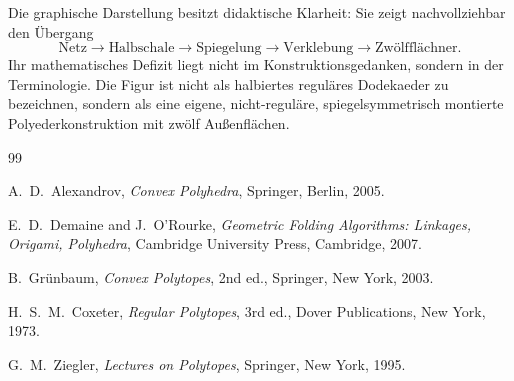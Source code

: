 \documentclass[11pt]{article}
\theoremstyle{plain}
\theoremstyle{definition}
\theoremstyle{remark}
\begin{document}
	Die graphische Darstellung besitzt didaktische Klarheit: Sie zeigt nachvollziehbar den Übergang
	\[
	\text{Netz} \longrightarrow \text{Halbschale} \longrightarrow \text{Spiegelung} \longrightarrow \text{Verklebung} \longrightarrow \text{Zwölfflächner}.
	\]
	Ihr mathematisches Defizit liegt nicht im Konstruktionsgedanken, sondern in der Terminologie. Die Figur ist nicht als halbiertes reguläres Dodekaeder zu bezeichnen, sondern als eine eigene, nicht-reguläre, spiegelsymmetrisch montierte Polyederkonstruktion mit zwölf Außenflächen.
	
	\begin{thebibliography}{99}
		
		A.~D.~Alexandrov,
		\emph{Convex Polyhedra},
		Springer, Berlin, 2005.
		
		E.~D.~Demaine and J.~O'Rourke,
		\emph{Geometric Folding Algorithms: Linkages, Origami, Polyhedra},
		Cambridge University Press, Cambridge, 2007.
		
		B.~Gr\"unbaum,
		\emph{Convex Polytopes},
		2nd ed., Springer, New York, 2003.
		
		H.~S.~M.~Coxeter,
		\emph{Regular Polytopes},
		3rd ed., Dover Publications, New York, 1973.
		
		G.~M.~Ziegler,
		\emph{Lectures on Polytopes},
		Springer, New York, 1995.
		
	\end{thebibliography}
	
\end{document}
